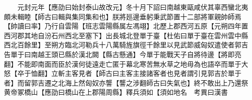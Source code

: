 　　元封元年【應劭曰始封泰山故改元】冬十月下詔曰南越東甌咸伏其辜西蠻北夷頗未輯睦【師古曰輯與集同集和也】朕將廵邊垂躬秉武節置十二部將軍親帥師焉【帥讀曰率】乃行自雲陽【班志雲陽縣属左馮翊】北歷上郡西河五原【元朔四年置西河郡其地自汾石州西北至塞下】出長城北登單于臺【杜佑曰單于臺在雲州雲中縣西北百餘里】至朔方臨北河勒兵十八萬騎旌旗徑千餘里以見武節威匈奴遣使者郭吉告單于曰南越王頭已縣於漢北闕【縣古懸通】今單于能戰天子自將待邊【將即亮翻】不能即南面而臣於漢何徒遠走亡匿于幕北寒苦無水草之地毋為也語卒而單于大怒【卒于恤翻】立斬主客見者【師古曰主客主接諸客者也見者謂引見郭吉於單于者】而留郭吉遷之北海上然匈奴亦讋【讋之涉翻師古曰失氣也】終不敢出上乃還祭黄帝冢橋山【應劭曰橋山在上郡陽周縣】釋兵須如【須如地名　考異曰漢書